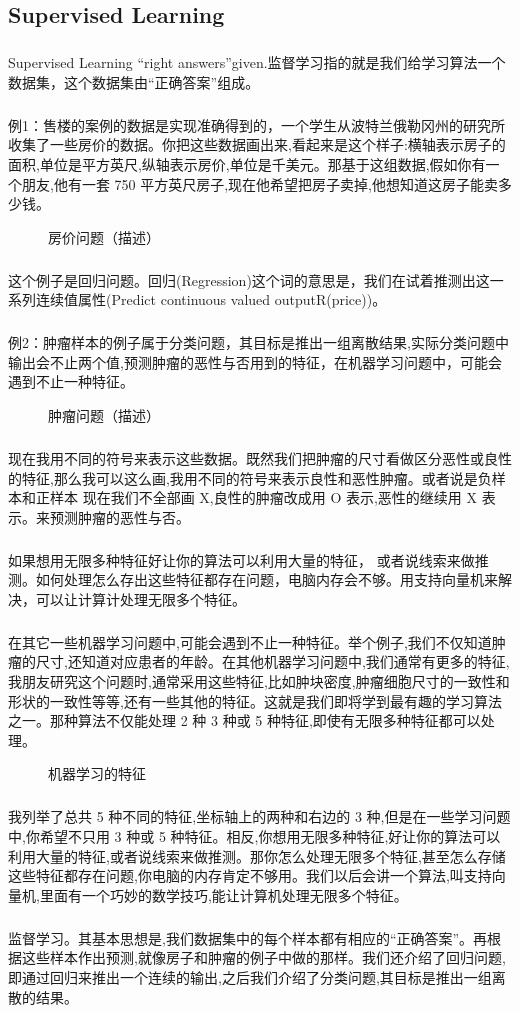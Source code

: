 \documentclass{article}
\begin{document}
\begin{CJK}{UTF8}{gbsn}
\subsection{Supervised Learning}
\subparagraph*{}
Supervised Learning ``right answers''given.监督学习指的就是我们给学习算法一个数据集，这个数据集由“正确答案”组成。
\subparagraph*{}
例1：售楼的案例的数据是实现准确得到的，一个学生从波特兰俄勒冈州的研究所收集了一些房价的数据。你把这些数据画出来,看起来是这个样子:横轴表示房子的面积,单位是平方英尺,纵轴表示房价,单位是千美元。那基于这组数据,假如你有一个朋友,他有一套 750 平方英尺房子,现在他希望把房子卖掉,他想知道这房子能卖多少钱。
\begin{figure}[H]
\caption{房价问题（描述）}
\label{fig:price}
\end{figure}
\subparagraph*{}
这个例子是回归问题。回归(Regression)这个词的意思是，我们在试着推测出这一系列连续值属性(Predict continuous valued outputR(price))。
\subparagraph*{}
例2：肿瘤样本的例子属于分类问题，其目标是推出一组离散结果,实际分类问题中输出会不止两个值,预测肿瘤的恶性与否用到的特征，在机器学习问题中，可能会遇到不止一种特征。
\begin{figure}[H]
\caption{肿瘤问题（描述）}
\label{fig:zhongliu}
\end{figure}
\subparagraph*{}
现在我用不同的符号来表示这些数据。既然我们把肿瘤的尺寸看做区分恶性或良性的特征,那么我可以这么画,我用不同的符号来表示良性和恶性肿瘤。或者说是负样本和正样本
现在我们不全部画 X,良性的肿瘤改成用 O 表示,恶性的继续用 X 表示。来预测肿瘤的恶性与否。
\subparagraph*{}
如果想用无限多种特征好让你的算法可以利用大量的特征，
或者说线索来做推测。如何处理怎么存出这些特征都存在问题，电脑内存会不够。用支持向量机来解决，可以让计算计处理无限多个特征。
\subparagraph*{}
在其它一些机器学习问题中,可能会遇到不止一种特征。举个例子,我们不仅知道肿瘤的尺寸,还知道对应患者的年龄。在其他机器学习问题中,我们通常有更多的特征,我朋友研究这个问题时,通常采用这些特征,比如肿块密度,肿瘤细胞尺寸的一致性和形状的一致性等等,还有一些其他的特征。这就是我们即将学到最有趣的学习算法之一。那种算法不仅能处理 2 种 3 种或 5 种特征,即使有无限多种特征都可以处理。
\begin{figure}[H]
\caption{机器学习的特征}
\label{fig:1}
\end{figure}
\subparagraph*{}
我列举了总共 5 种不同的特征,坐标轴上的两种和右边的 3 种,但是在一些学习问题中,你希望不只用 3 种或 5 种特征。相反,你想用无限多种特征,好让你的算法可以
利用大量的特征,或者说线索来做推测。那你怎么处理无限多个特征,甚至怎么存储这些特征都存在问题,你电脑的内存肯定不够用。我们以后会讲一个算法,叫支持向量机,里面有一个巧妙的数学技巧,能让计算机处理无限多个特征。
\subparagraph*{}
监督学习。其基本思想是,我们数据集中的每个样本都有相应的“正确答案”。再根据这些样本作出预测,就像房子和肿瘤的例子中做的那样。我们还介绍了回归问题,即通过回归来推出一个连续的输出,之后我们介绍了分类问题,其目标是推出一组离散的结果。

\end{CJK}
\end{document}
